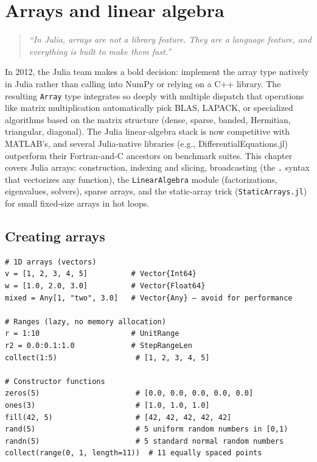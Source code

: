 \chapter{Arrays and linear algebra}
\label{ch:arrays-linalg}

\begin{quote}
\emph{``In Julia, arrays are not a library feature. They are a language feature, and everything is built to make them fast.''}
\end{quote}

In 2012, the Julia team makes a bold decision: implement the array type natively in Julia rather than calling into NumPy or relying on a C++ library. The resulting \texttt{Array} type integrates so deeply with multiple dispatch that operations like matrix multiplication automatically pick BLAS, LAPACK, or specialized algorithms based on the matrix structure (dense, sparse, banded, Hermitian, triangular, diagonal). The Julia linear-algebra stack is now competitive with MATLAB's, and several Julia-native libraries (e.g., DifferentialEquations.jl) outperform their Fortran-and-C ancestors on benchmark suites. This chapter covers Julia arrays: construction, indexing and slicing, broadcasting (the \texttt{.} syntax that vectorizes any function), the \texttt{LinearAlgebra} module (factorizations, eigenvalues, solvers), sparse arrays, and the static-array trick (\texttt{StaticArrays.jl}) for small fixed-size arrays in hot loops.

\section{Creating arrays}

\begin{verbatim}
# 1D arrays (vectors)
v = [1, 2, 3, 4, 5]          # Vector{Int64}
w = [1.0, 2.0, 3.0]          # Vector{Float64}
mixed = Any[1, "two", 3.0]   # Vector{Any} — avoid for performance

# Ranges (lazy, no memory allocation)
r = 1:10                     # UnitRange
r2 = 0.0:0.1:1.0             # StepRangeLen
collect(1:5)                  # [1, 2, 3, 4, 5]

# Constructor functions
zeros(5)                      # [0.0, 0.0, 0.0, 0.0, 0.0]
ones(3)                       # [1.0, 1.0, 1.0]
fill(42, 5)                   # [42, 42, 42, 42, 42]
rand(5)                       # 5 uniform random numbers in [0,1)
randn(5)                      # 5 standard normal random numbers
collect(range(0, 1, length=11))  # 11 equally spaced points
\end{verbatim}

